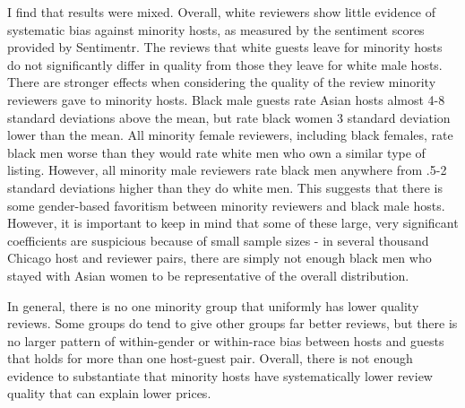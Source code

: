 I find that results were mixed. Overall, white reviewers show little evidence of systematic bias against minority hosts, as measured by the sentiment scores provided by Sentimentr. The reviews that white guests leave for minority hosts do not significantly differ in quality from those they leave for white male hosts. There are stronger effects when considering the quality of the review minority reviewers gave to minority hosts. Black male guests rate Asian hosts almost 4-8 standard deviations above the mean, but rate black women 3 standard deviation lower than the mean. All minority female reviewers, including black females, rate black men worse than they would rate white men who own a similar type of listing. However, all minority male reviewers rate black men anywhere from .5-2 standard deviations higher than they do white men. This suggests that there is some gender-based favoritism between minority reviewers and black male hosts. However, it is important to keep in mind that some of these large, very significant coefficients are suspicious because of small sample sizes - in several thousand Chicago host and reviewer pairs, there are simply not enough black men who stayed with Asian women to be representative of the overall distribution.

In general, there is no one minority group that uniformly has lower quality reviews. Some groups do tend to give other groups far better reviews, but there is no larger pattern of within-gender or within-race bias between hosts and guests that holds for more than one host-guest pair. Overall, there is not enough evidence to substantiate that minority hosts have systematically lower review quality that can explain lower prices. 
